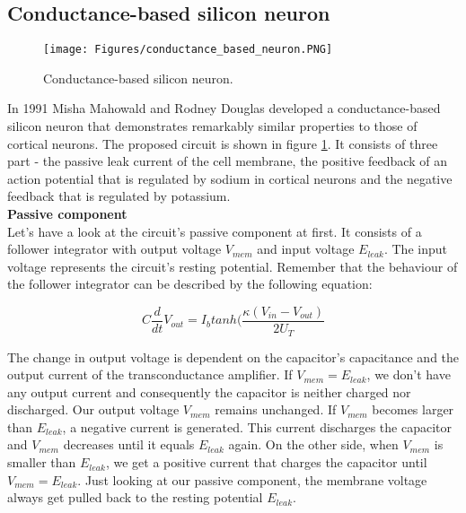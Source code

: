 \subsection{Conductance-based silicon neuron}

\begin{figure}
    \centering
    \texttt{[image: Figures/conductance\_based\_neuron.PNG]}
    \caption{Conductance-based silicon neuron.}
    \label{fig:conductance_based_neuron}
\end{figure}

In 1991 Misha Mahowald and Rodney Douglas developed a conductance-based silicon neuron that demonstrates remarkably similar properties to those of cortical neurons. The proposed circuit is shown in figure \ref{fig:conductance_based_neuron}. It consists of three part - the passive leak current of the cell membrane, the positive feedback of an action potential that is regulated by sodium in cortical neurons and the negative feedback that is regulated by potassium.\\

\textbf{Passive component}\\

Let's have a look at the circuit's passive component at first. It consists of a follower integrator with output voltage $V_{mem}$ and input voltage $E_{leak}$. The input voltage represents the circuit's resting potential. Remember that the behaviour of the follower integrator can be described by the following equation:

\begin{equation}
    C \frac{d}{dt} V_{out} = I_b tanh (\frac{\kappa (V_{in} - V_{out})}{2 U_T}
\end{equation}

The change in output voltage is dependent on the capacitor's capacitance and the output current of the transconductance amplifier. If $V_{mem} = E_{leak}$, we don't have any output current and consequently the capacitor is neither charged nor discharged. Our output voltage $V_{mem}$ remains unchanged. If $V_{mem}$ becomes larger than $E_{leak}$, a negative current is generated. This current discharges the capacitor and $V_{mem}$ decreases until it equals $E_{leak}$ again. On the other side, when $V_{mem}$ is smaller than $E_{leak}$, we get a positive current that charges the capacitor until $V_{mem} = E_{leak}$. Just looking at our passive component, the membrane voltage always get pulled back to the resting potential $E_{leak}$.\\


